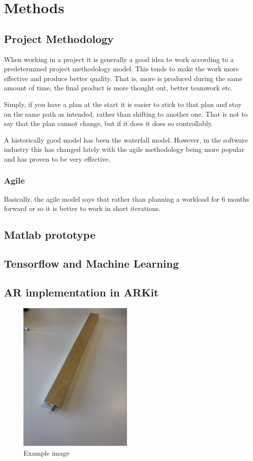 \section{Methods}


\subsection{Project Methodology}
When working in a project it is generally a good idea to work according to a predetermined project methodology model. This tends to make the work more effective and produce better quality. That is, more is produced during the same amount of time, the final product is more thought out, better teamwork etc.

Simply, if you have a plan at the start it is easier to stick to that plan and stay on the same path as intended, rather than shifting to another one. That is not to say that the plan cannot change, but if it does it does so controllably.

A historically good model has been the waterfall model. However, in the software industry this has changed lately with the agile methodology being more popular and has proven to be very effective.

\subsubsection{Agile}
Basically, the agile model says that rather than planning a workload for 6 months forward or so it is better to work in short iterations.


\subsection{Matlab prototype}


\subsection{Tensorflow and Machine Learning}

\subsection{AR implementation in ARKit}

\begin{figure}[hbtp]
\begin{center}
\includegraphics[width = 0.5\textwidth]{./Images/im1.jpg} 
\caption{Example image}
\end{center}
\end{figure}

\newpage